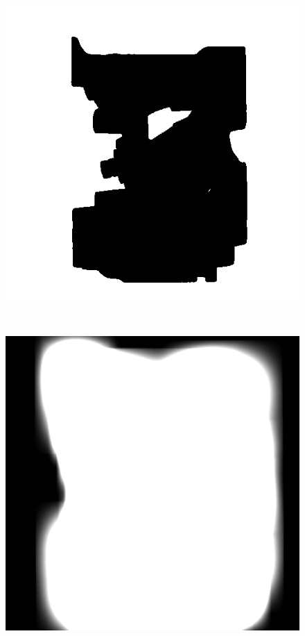 \begin{figure}
	\centering
	\begin{minipage}{.33\textwidth}
		\includegraphics[width=1\linewidth]{images/engine_naive_saliencemap_left}
	\end{minipage}~
	\begin{minipage}{.33\textwidth}
		\includegraphics[width=1\linewidth]{images/engine_naive_gaussian_1}

\end{minipage}
\end{figure}
